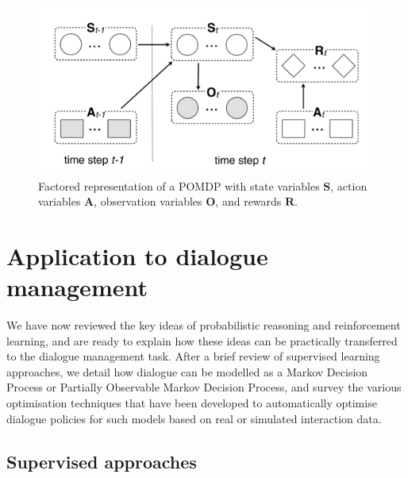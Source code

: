 \begin{figure}[ht]
\centering
\includegraphics[scale=0.25]{imgs/pomdp3.pdf}
\caption{Factored representation of a POMDP with state variables $\mathbf{S}$, action variables $\mathbf{A}$, observation variables $\mathbf{O}$, and rewards $\mathbf{R}$. }
\label{fig:pomdp3}
\end{figure}

\section{Application to dialogue management}
\label{sec:application-dm}

We have now reviewed the key ideas of probabilistic reasoning and reinforcement learning, and are ready to explain how these ideas can be practically transferred to the dialogue management task.  After a brief review of supervised learning approaches, we detail how dialogue can be modelled as a Markov Decision Process or Partially Observable Markov Decision Process, and survey the various optimisation techniques that have been developed to automatically optimise dialogue policies for such models based on real or simulated interaction data.  

\subsection{Supervised approaches}

